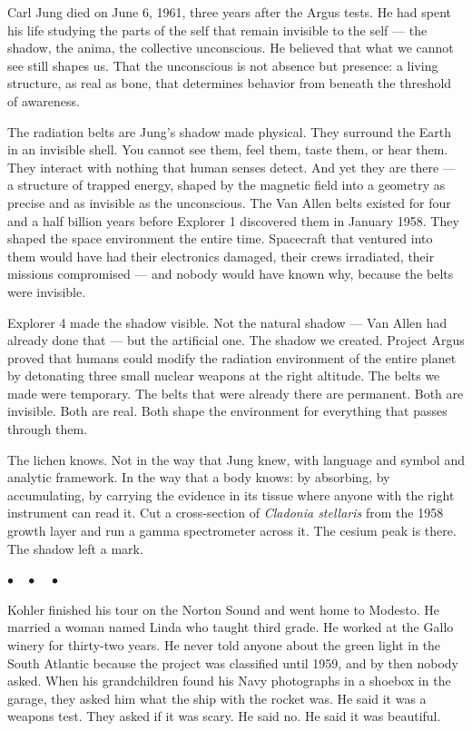 \documentclass[12pt, letterpaper]{article}
\begin{document}
Carl Jung died on June 6, 1961, three years after the Argus tests. He had spent his life studying the parts of the self that remain invisible to the self --- the shadow, the anima, the collective unconscious. He believed that what we cannot see still shapes us. That the unconscious is not absence but presence: a living structure, as real as bone, that determines behavior from beneath the threshold of awareness.

The radiation belts are Jung's shadow made physical. They surround the Earth in an invisible shell. You cannot see them, feel them, taste them, or hear them. They interact with nothing that human senses detect. And yet they are there --- a structure of trapped energy, shaped by the magnetic field into a geometry as precise and as invisible as the unconscious. The Van Allen belts existed for four and a half billion years before Explorer 1 discovered them in January 1958. They shaped the space environment the entire time. Spacecraft that ventured into them would have had their electronics damaged, their crews irradiated, their missions compromised --- and nobody would have known why, because the belts were invisible.

Explorer 4 made the shadow visible. Not the natural shadow --- Van Allen had already done that --- but the artificial one. The shadow we created. Project Argus proved that humans could modify the radiation environment of the entire planet by detonating three small nuclear weapons at the right altitude. The belts we made were temporary. The belts that were already there are permanent. Both are invisible. Both are real. Both shape the environment for everything that passes through them.

The lichen knows. Not in the way that Jung knew, with language and symbol and analytic framework. In the way that a body knows: by absorbing, by accumulating, by carrying the evidence in its tissue where anyone with the right instrument can read it. Cut a cross-section of \textit{Cladonia stellaris} from the 1958 growth layer and run a gamma spectrometer across it. The cesium peak is there. The shadow left a mark.

\begin{center}
$\bullet\quad\bullet\quad\bullet$
\end{center}

Kohler finished his tour on the Norton Sound and went home to Modesto. He married a woman named Linda who taught third grade. He worked at the Gallo winery for thirty-two years. He never told anyone about the green light in the South Atlantic because the project was classified until 1959, and by then nobody asked. When his grandchildren found his Navy photographs in a shoebox in the garage, they asked him what the ship with the rocket was. He said it was a weapons test. They asked if it was scary. He said no. He said it was beautiful.
\end{document}
